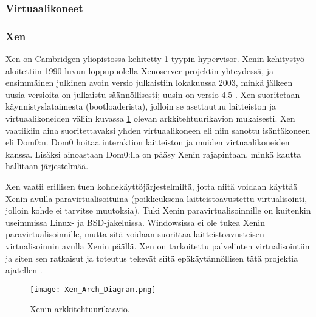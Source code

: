 \subsubsection{Virtuaalikoneet}
\subsubsection{Xen}
Xen on Cambridgen yliopistossa kehitetty 1-tyypin hypervisor. %
Xenin kehitystyö aloitettiin 1990-luvun loppupuolella Xenoserver-projektin yhteydessä, ja ensimmäinen julkinen avoin versio julkaistiin lokakuussa 2003, minkä jälkeen uusia versioita on julkaistu säännöllisesti; uusin on versio 4.5 \cite{xen_history}. Xen suoritetaan käynnistyslataimesta (bootloaderista), jolloin se asettautuu laitteiston ja virtuaalikoneiden väliin kuvassa \ref{kuva_xen} olevan arkkitehtuurikavion mukaisesti. Xen vaatiikiin aina suoritettavaksi yhden virtuaalikoneen eli niin sanottu isäntäkoneen eli Dom0:n. Dom0 hoitaa interaktion laitteiston ja muiden virtuaalikoneiden kanssa. Lisäksi ainoastaan Dom0:lla on pääsy Xenin rajapintaan, minkä kautta hallitaan järjestelmää.

Xen vaatii erillisen tuen kohdekäyttöjärjestelmiltä, jotta niitä voidaan käyttää Xenin avulla paravirtualisoituina (poikkeuksena laitteistoavustettu virtualisointi, jolloin kohde ei tarvitse muutoksia). Tuki Xenin paravirtualisoinnille on kuitenkin useimmissa Linux- ja BSD-jakeluissa. Windowsissa ei ole tukea Xenin paravirtualisoinnille, mutta sitä voidaan suorittaa laitteistoavusteisen virtualisoinnin avulla Xenin päällä. Xen on tarkoitettu palvelinten virtualisointiin ja siten sen ratkaisut ja toteutus tekevät siitä epäkäytännöllisen tätä projektia ajatellen \cite{xen_overview}.


\begin{figure}[H]
\centering
\texttt{[image: Xen\_Arch\_Diagram.png]}
\caption{Xenin arkkitehtuurikaavio\cite{xen_overview}.}
\label{kuva_xen}
\end{figure}


